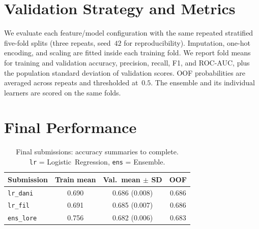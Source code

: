 \section{Validation Strategy and Metrics}
\label{sec:validation}

We evaluate each feature/model configuration with the same repeated stratified
five-fold splits (three repeats, seed~$42$ for reproducibility). Imputation,
one-hot encoding, and scaling are fitted inside each training fold. We report
fold means for training and validation accuracy, precision, recall, F1, and
ROC-AUC, plus the population standard deviation of validation scores. OOF
probabilities are averaged across repeats and thresholded at~$0.5$. The ensemble
and its individual learners are scored on the same folds.

\section{Final Performance}
\label{sec:results}

\begin{table}[ht]
    \centering
    \small
    \caption{Final submissions: accuracy summaries to complete.\\
    \texttt{lr} = Logistic~Regression, \texttt{ens} = Ensemble.}
    \label{tab:results}
    \begin{tabular}{@{}lccc@{}}
        \toprule
        Submission & Train mean & Val.\ mean $\pm$ SD & OOF   \\
        \midrule
        \texttt{lr\_dani}  & 0.690 & 0.686 (0.008) & 0.686 \\
        \texttt{lr\_fil}   & 0.691 & 0.685 (0.007) & 0.686 \\
        \texttt{ens\_lore} & 0.756 & 0.682 (0.006) & 0.683 \\
        \bottomrule
    \end{tabular}
\end{table}
